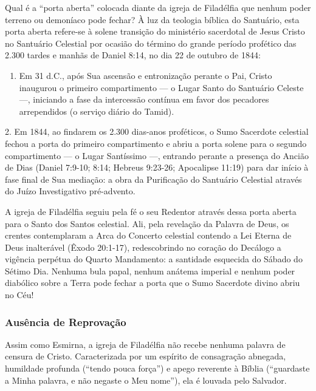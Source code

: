 Qual é a ``porta aberta'' colocada diante da igreja de Filadélfia que nenhum poder terreno ou demoníaco pode fechar?
À luz da teologia bíblica do Santuário, esta porta aberta refere-se à solene transição do ministério sacerdotal de Jesus Cristo no Santuário Celestial por ocasião do término do grande período profético das 2.300 tardes e manhãs de Daniel 8:14, no dia 22 de outubro de 1844:
\begin{enumerate}
  \item Em 31 d.C., após Sua ascensão e entronização perante o Pai, Cristo inaugurou o primeiro compartimento — o Lugar Santo do Santuário Celeste —, iniciando a fase da intercessão contínua em favor dos pecadores arrependidos (o serviço diário do Tamid).
\end{enumerate}

2. Em 1844, ao findarem os 2.300 dias-anos proféticos, o Sumo Sacerdote celestial fechou a porta do primeiro compartimento e abriu a porta solene para o segundo compartimento — o Lugar Santíssimo —, entrando perante a presença do Ancião de Dias (Daniel 7:9-10; 8:14; Hebreus 9:23-26; Apocalipse 11:19) para dar início à fase final de Sua mediação: a obra da Purificação do Santuário Celestial através do Juízo Investigativo pré-advento.

A igreja de Filadélfia seguiu pela fé o seu Redentor através dessa porta aberta para o Santo dos Santos celestial. Ali, pela revelação da Palavra de Deus, os crentes contemplaram a Arca do Concerto celestial contendo a Lei Eterna de Deus inalterável (Êxodo 20:1-17), redescobrindo no coração do Decálogo a vigência perpétua do Quarto Mandamento: a santidade esquecida do Sábado do Sétimo Dia. Nenhuma bula papal, nenhum anátema imperial e nenhum poder diabólico sobre a Terra pode fechar a porta que o Sumo Sacerdote divino abriu no Céu!


\subsubsection*{Ausência de Reprovação}
Assim como Esmirna, a igreja de Filadélfia não recebe nenhuma palavra de censura de Cristo. Caracterizada por um espírito de consagração abnegada, humildade profunda (``tendo pouca força'') e apego reverente à Bíblia (``guardaste a Minha palavra, e não negaste o Meu nome''), ela é louvada pelo Salvador.


